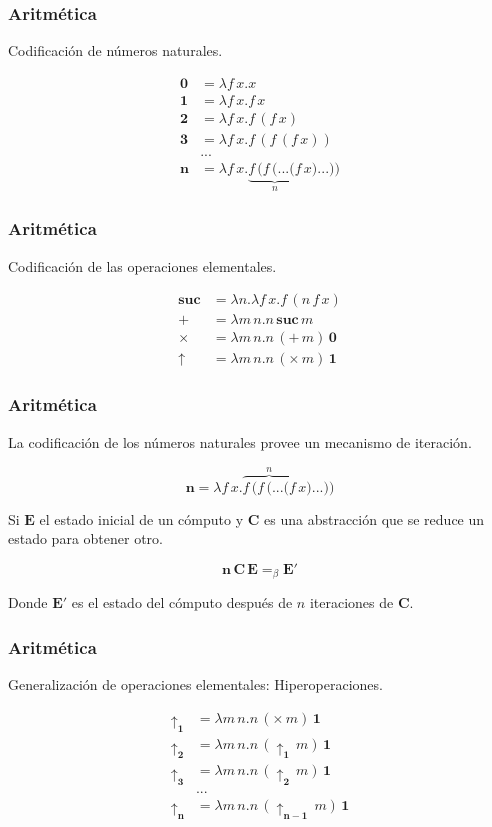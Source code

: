 \documentclass[pdf]{beamer}
\newcommand{\bs}{\boldsymbol}
\begin{document}
\begin{frame}
  \frametitle{Aritmética}
  Codificación de \alert{números naturales}.

  \begin{align*}
    \bs{0} &= λf\, x.x \\
    \bs{1} &= λf\, x.f\, x \\
    \bs{2} &= λf\, x.f\, (f\, x) \\
    \bs{3} &= λf\, x.f\, (f\, (f\, x)) \\
           &... \\
    \bs{n} &= λf\, x.\underbrace{f\, (f\, (... (f}_{n}\, x) ...))    
  \end{align*}
\end{frame}

\begin{frame}
  \frametitle{Aritmética}
  Codificación de las operaciones elementales.

  \begin{align*}
    \bs{suc} &= λn.λf\, x.f\, (n\, f\, x) \\
    \bs{\pmb{+}} &= λm\, n.n\, \bs{suc}\, m \\
    \bs{\pmb{\times}} &= λm\, n.n\, (\bs{\pmb{+}}\, m)\, \bs{0} \\
    \bs{\pmb{\uparrow}} &= λm\, n.n\, (\bs{\pmb{\times}}\, m)\, \bs{1}
  \end{align*}
  
\end{frame}

\begin{frame}
  \frametitle{Aritmética}
  La codificación de los números naturales provee un mecanismo de \alert{iteración}.

  \[ \bs{n} = λf\, x.\overbrace{f\, (f\, (... (f}^{n}\, x) ...)) \]

  Si \( \bs{E} \) el estado inicial de un cómputo y \( \bs{C} \) es una abstracción que se reduce un estado para obtener otro.

  \[ \bs{n}\, \bs{C}\, \bs{E} =_{β} \bs{E'} \]

  Donde \( \bs{E'} \) es el estado del cómputo después de \( n \) iteraciones de \( \bs{C} \).
  
\end{frame}

\begin{frame}
  \frametitle{Aritmética}
  Generalización de operaciones elementales: \alert{Hiperoperaciones}.

  \begin{align*}
    \bs{\pmb{\uparrow_{1}}} &= λm\, n.n\, (\bs{\pmb{\times}}\, m)\, \bs{1} \\
    \bs{\pmb{\uparrow_{2}}} &= λm\, n.n\, (\bs{\pmb{\uparrow_{1}}}\, m)\, \bs{1} \\
    \bs{\pmb{\uparrow_{3}}} &= λm\, n.n\, (\bs{\pmb{\uparrow_{2}}}\, m)\, \bs{1} \\
                      &... \\
    \bs{\pmb{\uparrow_{n}}} &= λm\, n.n\, (\bs{\pmb{\uparrow_{n-1}}}\, m)\, \bs{1}
  \end{align*}
  
\end{frame}
\end{document}
